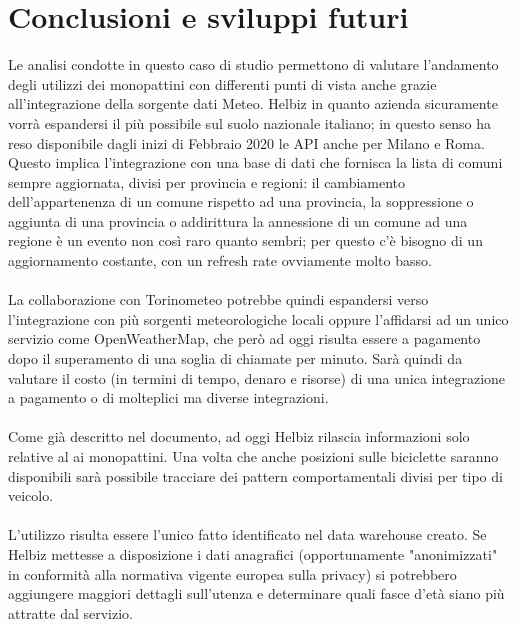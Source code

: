 \chapter{Conclusioni e sviluppi futuri}
Le analisi condotte in questo caso di studio permettono di valutare l'andamento degli 
utilizzi dei monopattini con differenti punti di vista anche grazie all’integrazione della sorgente dati
Meteo. Helbiz in quanto azienda sicuramente vorrà espandersi il più possibile sul suolo nazionale italiano;
in questo senso ha reso disponibile dagli inizi di Febbraio 2020 le API anche per Milano e Roma.
Questo implica l'integrazione con una base di dati che fornisca la lista di comuni sempre aggiornata, divisi per 
provincia e regioni: il cambiamento dell'appartenenza di un comune rispetto ad una provincia, la soppressione o aggiunta
di una provincia o addirittura la annessione di un comune ad una regione è un evento non così raro quanto sembri; per questo
c'è bisogno di un aggiornamento costante, con un refresh rate ovviamente molto basso. \\~\\


La collaborazione con Torinometeo potrebbe quindi espandersi verso l'integrazione con più sorgenti meteorologiche locali
oppure l'affidarsi ad un unico servizio come OpenWeatherMap, che però ad oggi risulta essere a pagamento dopo il superamento di una soglia di chiamate per minuto.
Sarà quindi da valutare il costo (in termini di tempo, denaro e risorse) di una unica integrazione a pagamento o di
molteplici ma diverse integrazioni.\\~\\


Come già descritto nel documento, ad oggi Helbiz rilascia informazioni solo relative al ai monopattini.
Una volta che anche posizioni sulle biciclette saranno disponibili sarà possibile tracciare dei pattern comportamentali
divisi per tipo di veicolo.\\~\\


L'utilizzo risulta essere l'unico fatto identificato nel data warehouse creato. Se Helbiz mettesse a disposizione i dati anagrafici
(opportunamente "anonimizzati" in conformità alla normativa vigente europea sulla privacy) si potrebbero aggiungere
maggiori dettagli sull'utenza e determinare quali fasce d'età siano più attratte dal servizio.

